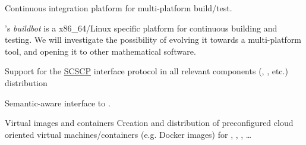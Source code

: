 \begin{workpackage}[id=component-architecture,wphases=0-48!.5,
  title=Component Architecture,lead=UV,
  PSRM=64,UVRM=8,SARM=16, USHRM=4, USORM=6, UORM=4, LLRM=22]
\begin{wpdelivs}
\begin{wpdeliv}[due=24,id=portability-cygwin64,dissem=PU,nature=OTHER,lead=PS]
    \end{wpdeliv}

    \begin{wpdeliv}[due=36,id=multiplatform-buildbot,dissem=PP,nature=DEM,lead=UV]
      {Continuous integration platform for multi-platform build/test.}

      \Sage's \emph{buildbot} is a x86\_64/Linux specific platform for
      continuous building and testing. We will investigate the
      possibility of evolving it towards a multi-platform tool, and
      opening it to other mathematical software.
    \end{wpdeliv}%
    \begin{wpdeliv}[due=12,id=scscp-sage,dissem=PU,nature=OTHER,lead=SA]
      {Support for the \href{http://www.symbolic-computing.org/}{SCSCP} interface protocol
        in all relevant components (\Sage, \GAP, etc.) distribution}
    \end{wpdeliv}

    \begin{wpdeliv}[due=36,id=semantic-interface-sage-gap,dissem=PU,nature=OTHER,lead=UO]
      {Semantic-aware \Sage interface to \GAP.}
    \end{wpdeliv}

    \begin{wpdeliv}[due=6,id=virtual-machines,dissem=PU,nature=OTHER,lead=UV]
      {Virtual images and containers} Creation and distribution of
      preconfigured cloud oriented virtual machines/containers
      (e.g. Docker images) for \PariGP, \Sage, \SMC, \dots
    \end{wpdeliv}


\end{wpdelivs}
\end{workpackage}
